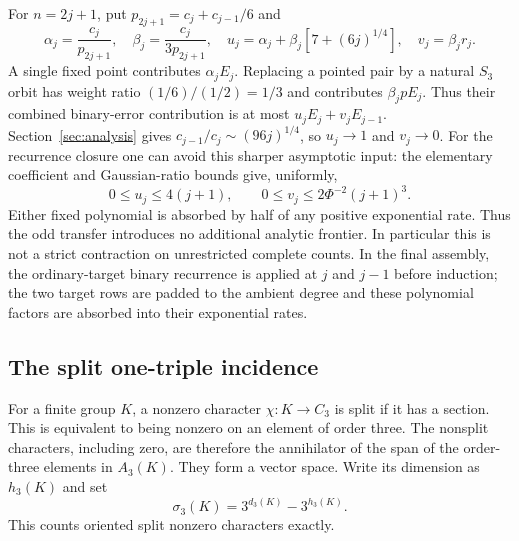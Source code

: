 For $n=2j+1$, put $p_{2j+1}=c_j+c_{j-1}/6$ and
\begin{equation}\label{eq:uv}
 \alpha_j=\frac{c_j}{p_{2j+1}},\quad
 \beta_j=\frac{c_j}{3p_{2j+1}},\quad
 u_j=\alpha_j+\beta_j[7+(6j)^{1/4}],\quad v_j=\beta_jr_j.
\end{equation}
A single fixed point contributes $\alpha_jE_j$.
Replacing a pointed pair by a natural $S_3$ orbit has weight ratio
$(1/6)/(1/2)=1/3$ and contributes $\beta_jpE_j$.
Thus their combined binary-error contribution is at most
$u_jE_j+v_jE_{j-1}$. Section~\ref{sec:analysis} gives
$c_{j-1}/c_j\sim(96j)^{1/4}$, so $u_j\to1$ and $v_j\to0$.
For the recurrence closure one can avoid this sharper asymptotic input:
the elementary coefficient and Gaussian-ratio bounds give, uniformly,
\[
 0\leq u_j\leq4(j+1),\qquad
 0\leq v_j\leq2\Phi^{-2}(j+1)^3.
\]
Either fixed polynomial is absorbed by half of any positive exponential
rate.  Thus the odd transfer introduces no additional analytic frontier.
In particular this is not a strict contraction on unrestricted complete
counts. In the final assembly, the ordinary-target binary recurrence is
applied at $j$ and $j-1$ before induction; the two target rows are padded to
the ambient degree and these polynomial factors are absorbed into their
exponential rates.

\subsection{The split one-triple incidence}
For a finite group $K$, a nonzero character $\chi:K\to C_3$ is split
if it has a section. This is equivalent to being nonzero on an element
of order three. The nonsplit characters, including zero, are therefore
the annihilator of the span of the order-three elements in $A_3(K)$.
They form a vector space. Write its dimension as $h_3(K)$ and set
\begin{equation}\label{eq:sigma3}
 \sigma_3(K)=3^{d_3(K)}-3^{h_3(K)}.
\end{equation}
This counts oriented split nonzero characters exactly.

